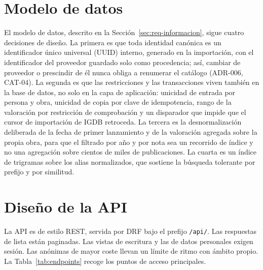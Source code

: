 \section{Modelo de datos}\label{sec:dis-modelo-datos}

El modelo de datos, descrito en la Sección~\ref{sec:req-informacion}, sigue cuatro decisiones
de diseño. La primera es que toda identidad canónica es un identificador único universal
(UUID) interno, generado en la importación, con el identificador del proveedor guardado solo
como procedencia; así, cambiar de proveedor o prescindir de él nunca obliga a renumerar el
catálogo (ADR-006, CAT-04). La segunda es que las restricciones y las transacciones viven
también en la base de datos, no solo en la capa de aplicación: unicidad de entrada por
persona y obra, unicidad de copia por clave de idempotencia, rango de la valoración por
restricción de comprobación y un disparador que impide que el cursor de importación de IGDB
retroceda. La tercera es la desnormalización deliberada de la fecha de primer lanzamiento y
de la valoración agregada sobre la propia obra, para que el filtrado por año y por nota sea
un recorrido de índice y no una agregación sobre cientos de miles de publicaciones. La cuarta
es un índice de trigramas sobre los alias normalizados, que sostiene la búsqueda tolerante
por prefijo y por similitud.

\section{Diseño de la API}\label{sec:dis-api}

La API es de estilo REST, servida por DRF bajo el prefijo \texttt{/api/}. Las respuestas de
lista están paginadas. Las vistas de escritura y las de datos personales exigen sesión. Las
anónimas de mayor coste llevan un límite de ritmo con ámbito propio. La
Tabla~\ref{tab:endpoints} recoge los puntos de acceso principales.

